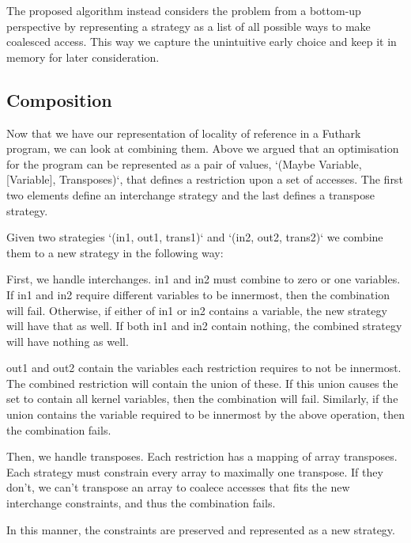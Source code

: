 \documentclass{article}
\begin{document}
The proposed algorithm instead considers the problem from a bottom-up perspective by representing a strategy as a list of all possible ways to make coalesced
access. This way we capture the unintuitive early choice and keep it in memory for later consideration.

\subsection{Composition}

Now that we have our representation of locality of reference in a Futhark program, we can look at combining them. Above we argued that an optimisation for the
program can be represented as a pair of values, `(Maybe Variable, [Variable], Transposes)`, that defines a restriction upon a set of accesses. The first two
elements define an interchange strategy and the last defines a transpose strategy.

Given two strategies `(in1, out1, trans1)` and `(in2, out2, trans2)` we combine them to a new strategy in the following way:

First, we handle interchanges. in1 and in2 must combine to zero or one variables. If in1 and in2 require different variables to be innermost, then the
combination will fail. Otherwise, if either of in1 or in2 contains a variable, the new strategy will have that as well. If both in1 and in2 contain nothing, the
combined strategy will have nothing as well.

out1 and out2 contain the variables each restriction requires to not be innermost. The combined restriction will contain the union of these. If this union
causes the set to contain all kernel variables, then the combination will fail. Similarly, if the union contains the variable required to be innermost by the
above operation, then the combination fails.

Then, we handle transposes. Each restriction has a mapping of array transposes.
Each strategy must constrain every array to maximally one transpose. If they don't, we can't transpose an array to coalece
accesses that fits the new interchange constraints, and thus the combination fails.

In this manner, the constraints are preserved and represented as a new strategy. 
\end{document}
